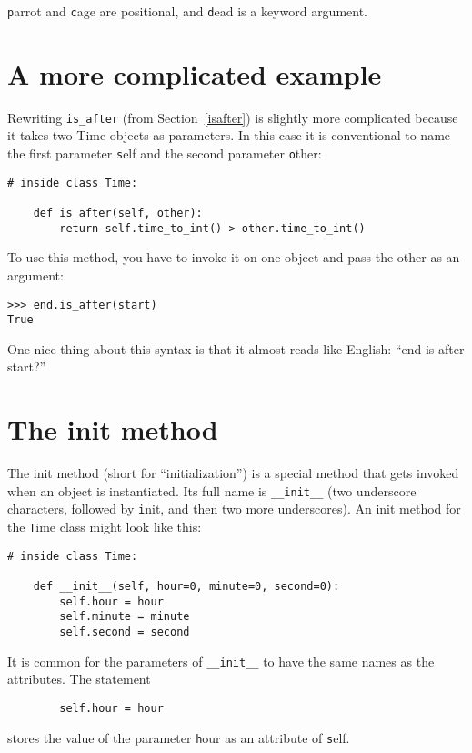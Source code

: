 \documentclass[
DIV=11,
fontsize=12,
twoside,
headinclude=false,
titlepage=firstiscover,
abstract=true,
headsepline=true,
footsepline=true,
chapterprefix=true, %
headings=big,
bibliography=totoc,%
captions=tableheading
]{scrbook}
\theoremstyle{definition}
\begin{document}
{\texttt parrot} and {\texttt cage} are positional, and {\texttt dead} is
a keyword argument.


\section{A more complicated example}

Rewriting \verb"is_after" (from Section~\ref{isafter}) is slightly
more complicated because it takes two Time objects as parameters.  In
this case it is conventional to name the first parameter {\texttt self}
and the second parameter {\texttt other}: 

\begin{lstlisting}
# inside class Time:

    def is_after(self, other):
        return self.time_to_int() > other.time_to_int()
\end{lstlisting}
%
To use this method, you have to invoke it on one object and pass
the other as an argument:

\begin{lstlisting}
>>> end.is_after(start)
True
\end{lstlisting}
%
One nice thing about this syntax is that it almost reads
like English: ``end is after start?''


\section{The init method}

The init method (short for ``initialization'') is
a special method that gets invoked when an object is instantiated.  
Its full name is \verb"__init__" (two underscore characters,
followed by {\texttt init}, and then two more underscores).  An
init method for the {\texttt Time} class might look like this:

\begin{lstlisting}
# inside class Time:

    def __init__(self, hour=0, minute=0, second=0):
        self.hour = hour
        self.minute = minute
        self.second = second
\end{lstlisting}
%
It is common for the parameters of \verb"__init__"
to have the same names as the attributes.  The statement

\begin{lstlisting}
        self.hour = hour
\end{lstlisting}
%
stores the value of the parameter {\texttt hour} as an attribute
of {\texttt self}.
\end{document}
